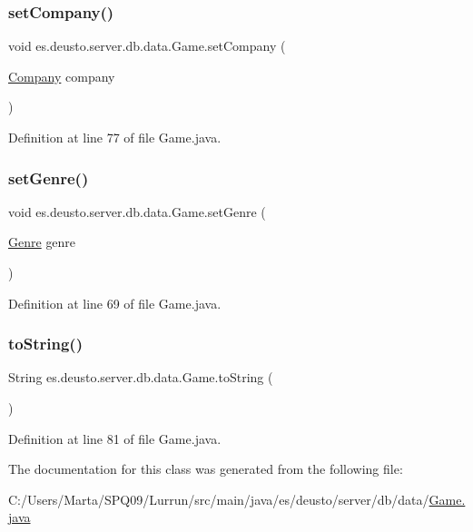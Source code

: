 \subsubsection{\texorpdfstring{set\+Company()}{setCompany()}}
{\footnotesize\ttfamily void es.\+deusto.\+server.\+db.\+data.\+Game.\+set\+Company (\begin{DoxyParamCaption}\item[{\hyperlink{classes_1_1deusto_1_1server_1_1db_1_1data_1_1_company}{Company}}]{company }\end{DoxyParamCaption})}



Definition at line 77 of file Game.\+java.

\mbox{\label{classes_1_1deusto_1_1server_1_1db_1_1data_1_1_game_a61d197148280723f018c7ef18e37cb7e}} 
\subsubsection{\texorpdfstring{set\+Genre()}{setGenre()}}
{\footnotesize\ttfamily void es.\+deusto.\+server.\+db.\+data.\+Game.\+set\+Genre (\begin{DoxyParamCaption}\item[{\hyperlink{classes_1_1deusto_1_1server_1_1db_1_1data_1_1_genre}{Genre}}]{genre }\end{DoxyParamCaption})}



Definition at line 69 of file Game.\+java.

\mbox{\label{classes_1_1deusto_1_1server_1_1db_1_1data_1_1_game_aae9eb6e19b8f730b9554cfac23c8298b}} 
\subsubsection{\texorpdfstring{to\+String()}{toString()}}
{\footnotesize\ttfamily String es.\+deusto.\+server.\+db.\+data.\+Game.\+to\+String (\begin{DoxyParamCaption}{ }\end{DoxyParamCaption})}



Definition at line 81 of file Game.\+java.



The documentation for this class was generated from the following file\+:\begin{DoxyCompactItemize}
\item 
C\+:/\+Users/\+Marta/\+S\+P\+Q09/\+Lurrun/src/main/java/es/deusto/server/db/data/\hyperlink{_game_8java}{Game.\+java}\end{DoxyCompactItemize}
